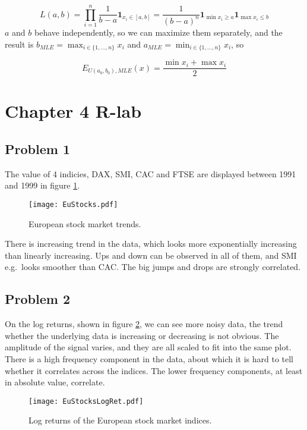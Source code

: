 \documentclass{article}
\begin{document}
\begin{enumerate}[(a)]
          \[L\left( {a,b} \right) = \prod\limits_{i = 1}^n {\frac{1}{{b - a}}{{\mathbf{1}}_{{x_i} \in \left[ {a,b} \right]}}}  = \frac{1}{{{{\left( {b - a} \right)}^n}}}{{\mathbf{1}}_{\min {x_i} \geqslant a}}{{\mathbf{1}}_{\max {x_i} \leqslant b}}\]
          $a$ and $b$ behave independently, so we can maximize them separately, and the result is $b_{MLE} = \max_{i\in \{1,\ldots,n\}} {x_i}$ and $a_{MLE} = \min_{i\in \{1,\ldots,n\}} {x_i}$, so

          \[
              {E_{U\left( {{a_{0}},{b_{0}}} \right),MLE}}\left( x \right) = \frac{{\min {x_i} + \max {x_i}}}{2}
          \]

\end{enumerate}
\section{Chapter 4 R-lab}
\subsection{Problem 1}
The value of 4 indicies, DAX, SMI, CAC and FTSE are displayed between 1991 and 1999 in figure \ref{fig:eustocks}.
\begin{figure}[htbp]
    \centering
    \texttt{[image: EuStocks.pdf]}
    \caption{European stock market trends.}
    \label{fig:eustocks}
\end{figure}
There is increasing trend in the data, which looks more exponentially increasing than linearly increasing.
Ups and down can be observed in all of them, and SMI e.g.\ looks smoother than CAC.
The big jumps and drops are strongly correlated.

\subsection{Problem 2}
On the log returns, shown in figure \ref{fig:logreturns}, we can see more noisy data,
the trend whether the underlying data is increasing or decreasing is not obvious.
The amplitude of the signal varies, and they are all scaled to fit into the same plot.
There is a high frequency component in the data,
about which it is hard to tell whether it correlates across the indices.
The lower frequency components, at least in absolute value, correlate.
\begin{figure}[htbp]
    \centering
    \texttt{[image: EuStocksLogRet.pdf]}
    \caption{Log returns of the European stock market indices.}
    \label{fig:logreturns}
\end{figure}
\end{document}
